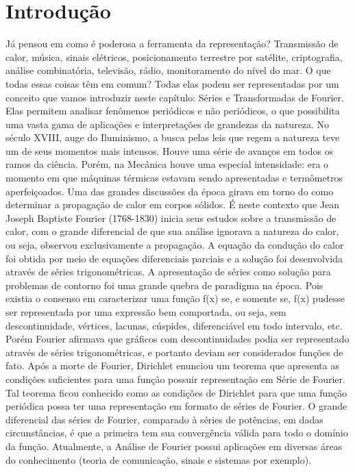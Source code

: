
\chapter{Introdução}

Já pensou em como é poderosa a ferramenta da representação?
Transmissão de calor, música, sinais elétricos, posicionamento terrestre por satélite, criptografia, análise combinatória, televisão, rádio, monitoramento do nível do mar. O que todas essas coisas têm em comum? Todas elas podem ser representadas por um conceito que vamos introduzir neste capítulo: Séries e Transformadas de Fourier. Elas permitem analisar fenômenos periódicos e não periódicos, o que possibilita uma vasta gama de aplicações e interpretações de grandezas da natureza.
    No século XVIII, auge do Iluminismo, a busca pelas leis que regem a natureza teve um de seus momentos mais intensos. Houve uma série de avanços em todos os ramos da ciência. Porém, na Mecânica houve uma especial intensidade: era o momento em que máquinas térmicas estavam sendo apresentadas e termômetros aperfeiçoados. Uma das grandes discussões da época girava em torno do como determinar a propagação de calor em corpos sólidos.
    É neste contexto que Jean Joseph Baptiste Fourier (1768-1830) inicia seus estudos sobre a transmissão de calor, com o grande diferencial de que sua análise ignorava a natureza do calor, ou seja, observou exclusivamente a propagação. A equação da condução do calor foi obtida por meio de equações diferenciais parciais e a solução foi desenvolvida através de séries trigonométricas.
A apresentação de séries como solução para problemas de contorno foi uma grande quebra de paradigma na época. Pois existia o consenso em caracterizar uma função f(x) se, e somente se, f(x) pudesse ser representada por uma expressão bem comportada, ou seja, sem descontinuidade, vértices, lacunas, cúspides, diferenciável em todo intervalo, etc. Porém Fourier afirmava que gráficos com descontinuidades podia ser representado através de séries trigonométricas, e portanto deviam ser considerados funções de fato.
Após a morte de Fourier, Dirichlet enunciou um teorema que apresenta as condições suficientes para uma função possuir representação em Série de Fourier. Tal teorema  ficou conhecido como as condições de Dirichlet para que uma função periódica possa ter uma representação em formato de séries de Fourier.  O grande diferencial das séries de Fourier, comparado à séries de potências, em dadas circunstâncias, é que a primeira tem sua convergência válida para todo o domínio da função.
Atualmente, a Análise de Fourier possui aplicações em diversas áreas do conhecimento (teoria de comunicação, sinais e sistemas por exemplo).

\emconstrucao

